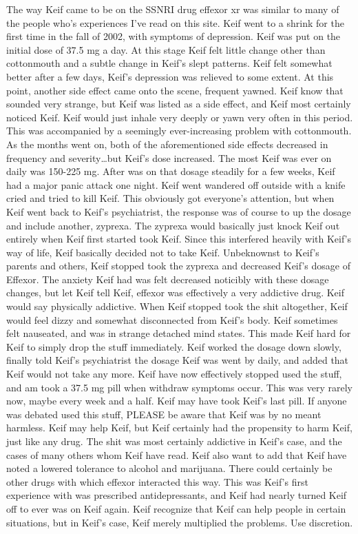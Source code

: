 \documentclass[12pt]{book}
\begin{document}
The way Keif came to be on the SSNRI drug effexor xr was similar to many of the people who's experiences I've read on this site. Keif went to a shrink for the first time in the fall of 2002, with symptoms of depression. Keif was put on the initial dose of 37.5 mg a day. At this stage Keif felt little change other than cottonmouth and a subtle change in Keif's slept patterns. Keif felt somewhat better after a few days, Keif's depression was relieved to some extent. At this point, another side effect came onto the scene, frequent yawned. Keif know that sounded very strange, but Keif was listed as a side effect, and Keif most certainly noticed Keif. Keif would just inhale very deeply or yawn very often in this period. This was accompanied by a seemingly ever-increasing problem with cottonmouth. As the months went on, both of the aforementioned side effects decreased in frequency and severity\ldots but Keif's dose increased. The most Keif was ever on daily was 150-225 mg. After was on that dosage steadily for a few weeks, Keif had a major panic attack one night. Keif went wandered off outside with a knife cried and tried to kill Keif. This obviously got everyone's attention, but when Keif went back to Keif's psychiatrist, the response was of course to up the dosage and include another, zyprexa. The zyprexa would basically just knock Keif out entirely when Keif first started took Keif. Since this interfered heavily with Keif's way of life, Keif basically decided not to take Keif. Unbeknownst to Keif's parents and others, Keif stopped took the zyprexa and decreased Keif's dosage of Effexor. The anxiety Keif had was felt decreased noticibly with these dosage changes, but let Keif tell Keif, effexor was effectively a very addictive drug. Keif would say physically addictive. When Keif stopped took the shit altogether, Keif would feel dizzy and somewhat disconnected from Keif's body. Keif sometimes felt nauseated, and was in strange detached mind states. This made Keif hard for Keif to simply drop the stuff immediately. Keif worked the dosage down slowly, finally told Keif's psychiatrist the dosage Keif was went by daily, and added that Keif would not take any more. Keif have now effectively stopped used the stuff, and am took a 37.5 mg pill when withdraw symptoms occur. This was very rarely now, maybe every week and a half. Keif may have took Keif's last pill. If anyone was debated used this stuff, PLEASE be aware that Keif was by no meant harmless. Keif may help Keif, but Keif certainly had the propensity to harm Keif, just like any drug. The shit was most certainly addictive in Keif's case, and the cases of many others whom Keif have read. Keif also want to add that Keif have noted a lowered tolerance to alcohol and marijuana. There could certainly be other drugs with which effexor interacted this way. This was Keif's first experience with was prescribed antidepressants, and Keif had nearly turned Keif off to ever was on Keif again. Keif recognize that Keif can help people in certain situations, but in Keif's case, Keif merely multiplied the problems. Use discretion.
\end{document}
